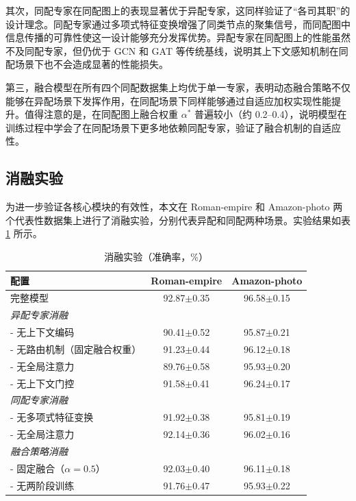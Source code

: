 \documentclass[a4paper,10pt]{article}
\begin{document}
其次，同配专家在同配图上的表现显著优于异配专家，这同样验证了“各司其职”的设计理念。同配专家通过多项式特征变换增强了同类节点的聚集信号，而同配图中信息传播的可靠性使这一设计能够充分发挥优势。异配专家在同配图上的性能虽然不及同配专家，但仍优于 GCN 和 GAT 等传统基线，说明其上下文感知机制在同配场景下也不会造成显著的性能损失。

第三，融合模型在所有四个同配数据集上均优于单一专家，表明动态融合策略不仅能够在异配场景下发挥作用，在同配场景下同样能够通过自适应加权实现性能提升。值得注意的是，在同配图上融合权重 $\alpha^*$ 普遍较小（约 0.2--0.4），说明模型在训练过程中学会了在同配场景下更多地依赖同配专家，验证了融合机制的自适应性。

\subsection{消融实验}

为进一步验证各核心模块的有效性，本文在 Roman-empire 和 Amazon-photo 两个代表性数据集上进行了消融实验，分别代表异配和同配两种场景。实验结果如表 \ref{tab:ablation} 所示。

\begin{table}[t]
\centering
\caption{消融实验（准确率，\%）}
\label{tab:ablation}
\begin{tabular}{l c c}
\toprule
配置 & Roman-empire & Amazon-photo \\
\midrule
完整模型 & 92.87$\pm$0.35 & 96.58$\pm$0.15 \\
\multicolumn{3}{l}{\textit{异配专家消融}} \\
- 无上下文编码 & 90.41$\pm$0.52 & 95.87$\pm$0.21 \\
- 无路由机制（固定融合权重） & 91.23$\pm$0.44 & 96.12$\pm$0.18 \\
- 无全局注意力 & 89.76$\pm$0.58 & 95.93$\pm$0.20 \\
- 无上下文门控 & 91.58$\pm$0.41 & 96.24$\pm$0.17 \\
\multicolumn{3}{l}{\textit{同配专家消融}} \\
- 无多项式特征变换 & 91.92$\pm$0.38 & 95.81$\pm$0.19 \\
- 无全局注意力 & 92.14$\pm$0.36 & 96.02$\pm$0.16 \\
\multicolumn{3}{l}{\textit{融合策略消融}} \\
- 固定融合（$\alpha=0.5$） & 92.03$\pm$0.40 & 96.11$\pm$0.18 \\
- 无两阶段训练 & 91.76$\pm$0.47 & 95.93$\pm$0.22 \\
\bottomrule
\end{tabular}
\end{table}
\end{document}
